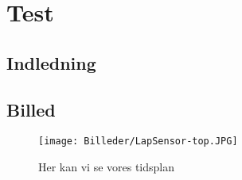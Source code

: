 \section{Test}

\subsection{Indledning}



\subsection{Billed}

\begin{figure}[h]
	\centering
		\texttt{[image: Billeder/LapSensor-top.JPG]}
	\caption{Her kan vi se vores tidsplan}
	\label{fig:Test}
\end{figure}
